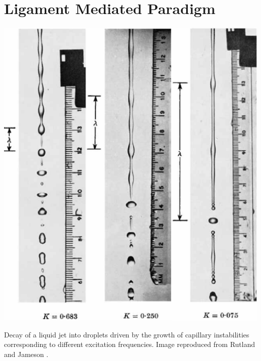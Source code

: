 \section*{Ligament Mediated Paradigm}

\begin{marginfigure}[1cm]
\centering
\includegraphics{plots/intro/jet.pdf}
\caption{Decay of a liquid jet into droplets driven by the growth of capillary instabilities corresponding 
	to different excitation frequencies. Image reproduced from Rutland and Jameson \cite{rutland1971non}.
	} 
\label{jet}
\end{marginfigure}

